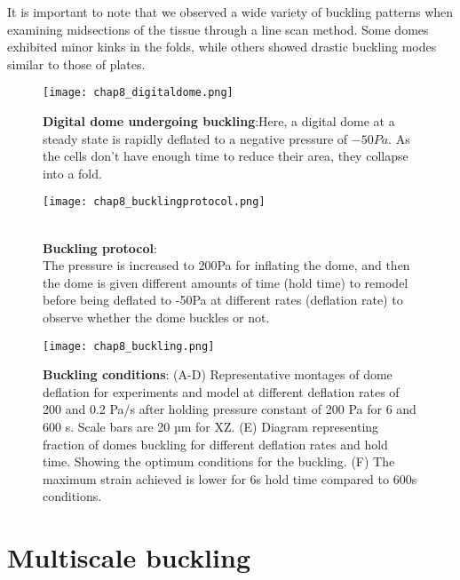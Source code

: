 It is important to note that we observed a wide variety of buckling patterns when examining midsections of the tissue through a line scan method. Some domes exhibited minor kinks in the folds, while others showed drastic buckling modes similar to those of plates.

\begin{figure}
	\centering
	\texttt{[image: chap8\_digitaldome.png]}
	\caption{\label{fig_8_1} \textbf{Digital dome undergoing buckling}:Here, a digital dome at a steady state is rapidly deflated to a negative pressure of $-50Pa$. As the cells don't have enough time to reduce their area, they collapse into a fold.
	}
\end{figure}

\begin{figure}
	\begin{minipage}[c]{0.6\textwidth}
		\texttt{[image: chap8\_bucklingprotocol.png]}
	\end{minipage}\hfill
	\begin{minipage}[c]{0.35\textwidth}
		\caption{\\ \textbf{Buckling protocol}:\\ The pressure is increased to 200Pa for inflating the dome, and then the dome is given different amounts of time (hold time) to remodel before being deflated to -50Pa at different rates (deflation rate) to observe whether the dome buckles or not.	} \label{fig_8_2}
	\end{minipage}
\end{figure}

\begin{figure}[h]
	\centering
	\texttt{[image: chap8\_buckling.png]}
	\caption{\label{fig_8_3} \textbf{Buckling conditions}: (A-D) Representative montages of dome deflation for experiments and model at different deflation rates of 200 and 0.2 Pa/s after holding pressure constant of 200 Pa for 6 and 600 s. Scale bars are 20 µm for XZ. (E) Diagram representing fraction of domes buckling for different deflation rates and hold time. Showing the optimum conditions for the buckling. (F) The maximum strain achieved is lower for 6s hold time compared to 600s conditions.
	}
\end{figure}


\hypertarget{multiscale-buckling}{%
	\section{Multiscale buckling}\label{multiscale-buckling}}

